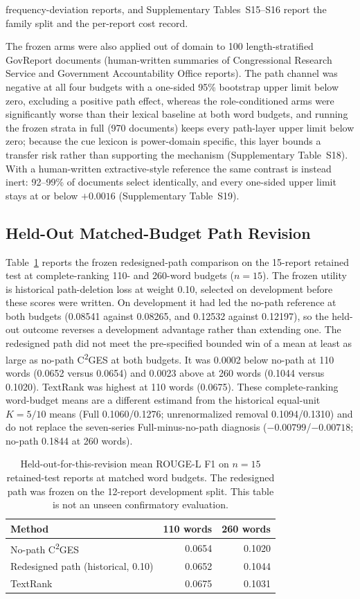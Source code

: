 \documentclass[information,article,submit,moreauthors]{Definitions/mdpi}
\newcommand{\cges}{C\textsuperscript{2}GES}
\begin{document}
frequency-deviation reports, and Supplementary Tables~S15--S16 report the family split and the per-report cost record.

The frozen arms were also applied out of domain to 100 length-stratified GovReport documents (human-written summaries of Congressional Research Service and Government Accountability Office reports). The path channel was negative at all four budgets with a one-sided 95\% bootstrap upper limit below zero, excluding a positive path effect, whereas the role-conditioned arms were significantly worse than their lexical baseline at both word budgets, and running the frozen strata in full (970 documents) keeps every path-layer upper limit below zero; because the cue lexicon is power-domain specific, this layer bounds a transfer risk rather than supporting the mechanism (Supplementary Table~S18). With a human-written extractive-style reference the same contrast is instead inert: 92--99\% of documents select identically, and every one-sided upper limit stays at or below $+0.0016$ (Supplementary Table~S19).

\subsection{Held-Out Matched-Budget Path Revision}

Table~\ref{tab:rsi-heldout} reports the frozen redesigned-path comparison on the 15-report retained test at complete-ranking 110- and 260-word budgets ($n=15$). The frozen utility is historical path-deletion loss at weight 0.10, selected on development before these scores were written. On development it had led the no-path reference at both budgets (0.08541 against 0.08265, and 0.12532 against 0.12197), so the held-out outcome reverses a development advantage rather than extending one. The redesigned path did not meet the pre-specified bounded win of a mean at least as large as no-path \cges{} at both budgets. It was 0.0002 below no-path at 110 words (0.0652 versus 0.0654) and 0.0023 above at 260 words (0.1044 versus 0.1020). TextRank was highest at 110 words (0.0675). These complete-ranking word-budget means are a different estimand from the historical equal-unit $K=5/10$ means (Full 0.1060/0.1276; unrenormalized removal 0.1094/0.1310) and do not replace the seven-series Full-minus-no-path diagnosis ($-0.00799$/$-0.00718$; no-path 0.1844 at 260 words).

\begin{table}[H]
\caption{Held-out-for-this-revision mean ROUGE-L F1 on $n=15$ retained-test reports at matched word budgets. The redesigned path was frozen on the 12-report development split. This table is not an unseen confirmatory evaluation.}
\label{tab:rsi-heldout}\centering\small
\begin{tabular}{lrr}
\toprule
Method & 110 words & 260 words\\
\midrule
No-path \cges{} & 0.0654 & 0.1020\\
Redesigned path (historical, 0.10) & 0.0652 & 0.1044\\
TextRank & 0.0675 & 0.1031\\
\bottomrule
\end{tabular}
\end{table}
\end{document}
